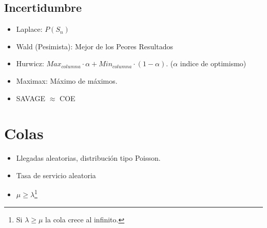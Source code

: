 \documentclass[10pt,letterpaper]{article}
\begin{document}
\subsection{Incertidumbre}
\begin{itemize}
\item Laplace: $P(S_n)$
\item Wald (Pesimista): Mejor de los Peores Resultados
\item Hurwicz: $Max_{columna}\cdot \alpha + Min_{columna}\cdot (1-\alpha)$. ($\alpha$ indice de optimismo)
\item Maximax: Máximo de máximos.
\item SAVAGE $\approx$ COE
\end{itemize}
\section{Colas}
\begin{itemize}
\item Llegadas aleatorias, distribución tipo Poisson.
\item Tasa de servicio aleatoria
\item $\mu \geq \lambda$\footnote{Si $\lambda\geq\mu$ la cola crece al infinito.}
\end{itemize}
\end{document}
